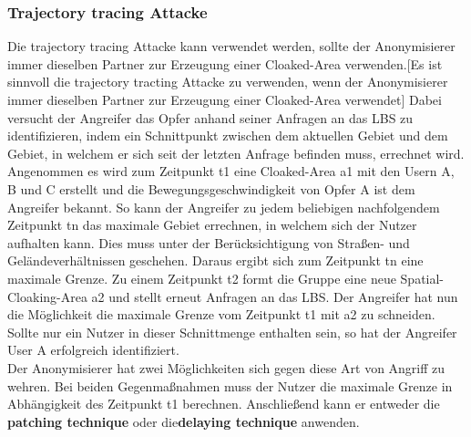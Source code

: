 \subsubsection{Trajectory tracing Attacke} 
Die trajectory tracing Attacke kann verwendet werden, sollte der Anonymisierer immer dieselben Partner zur Erzeugung einer Cloaked-Area verwenden.[Es ist sinnvoll die trajectory tracting Attacke zu verwenden, wenn der Anonymisierer immer dieselben Partner zur Erzeugung einer Cloaked-Area verwendet] Dabei versucht der Angreifer das Opfer anhand seiner Anfragen an das LBS zu identifizieren, indem ein Schnittpunkt zwischen dem aktuellen Gebiet und dem Gebiet, in welchem er sich seit der letzten Anfrage befinden muss, errechnet wird. Angenommen es wird zum Zeitpunkt t1 eine Cloaked-Area a1 mit den Usern A, B und C erstellt und die Bewegungsgeschwindigkeit von Opfer A ist dem Angreifer bekannt. So kann der Angreifer zu jedem beliebigen nachfolgendem Zeitpunkt tn das maximale Gebiet errechnen, in welchem sich der Nutzer aufhalten kann. Dies muss unter der Berücksichtigung von Straßen- und Geländeverhältnissen geschehen. Daraus ergibt sich zum Zeitpunkt tn eine maximale Grenze. Zu einem Zeitpunkt t2 formt die Gruppe eine neue Spatial-Cloaking-Area a2 und stellt erneut Anfragen an das LBS. Der Angreifer hat nun die Möglichkeit die maximale Grenze vom Zeitpunkt t1 mit a2 zu schneiden. Sollte nur ein Nutzer in dieser Schnittmenge enthalten sein, so hat der Angreifer User A erfolgreich identifiziert.\\  Der Anonymisierer hat zwei Möglichkeiten sich gegen diese Art von Angriff zu wehren. Bei beiden Gegenmaßnahmen muss der Nutzer die maximale Grenze in Abhängigkeit des Zeitpunkt t1 berechnen. Anschließend kann er entweder die \textbf{patching technique} oder die\textbf{delaying technique} anwenden. 
